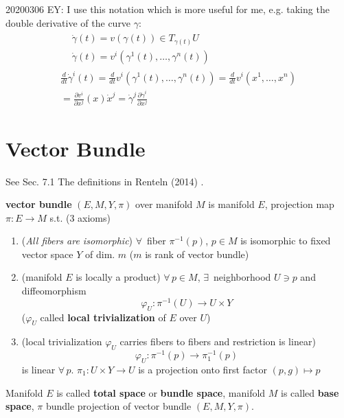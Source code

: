 20200306 EY: I use this notation which is more useful for me, e.g. taking the double derivative of the curve $\gamma$: 
\[
\begin{gathered} 
\begin{aligned} 
& \dot{\gamma}(t) = v(\gamma(t)) \in T_{\gamma(t)}U \\ 
& \dot{\gamma}(t) = v^i(\gamma^1(t), \dots, \gamma^n(t))
\end{aligned} \\ 
\frac{d}{dt} \dot{\gamma}^i(t) = \frac{d}{dt} v^i(\gamma^1(t), \dots , \gamma^n(t)) = \frac{d}{dt} v^i(x^1 , \dots , x^n) \\
= \frac{\partial v^i}{\partial x^j}(x) \dot{x}^j = \dot{\gamma}^j \frac{\partial \dot{\gamma}^i}{\partial x^j}
\end{gathered} 
\]

\section{Vector Bundle}

See Sec. 7.1 The definitions in Renteln (2014) \cite{dgdt:Rent2014}.

\begin{definition}
\textbf{vector bundle} $(E,M,Y,\pi)$ over manifold $M$ is manifold $E$, projection map $\pi:E \to M$ s.t. (3 axioms)
\begin{enumerate}
\item (\emph{All fibers are isomorphic}) $\forall \, $ fiber $\pi^{-1}(p)$, $p\in M$ is isomorphic to fixed vector space $Y$ of dim. $m$ ($m$ is rank of vector bundle)
\item (manifold $E$ is locally a product) $\forall \, p \in M$, $\exists \, $ neighborhood $U\ni p$ and diffeomorphism
\begin{equation}\label{dgdt:Eq:VectorBundleTotalSpaceIsLocalProduct}
\varphi_U: \pi^{-1}(U) \to U\times Y
\end{equation}
($\varphi_U$ called \textbf{local trivialization} of $E$ over $U$)
\item (local trivialization $\varphi_U$ carries fibers to fibers and restriction is linear) 
\begin{equation}
\varphi_U: \pi^{-1}(p) \to \pi^{-1}_1(p)
\end{equation}
is linear $\forall \, p$. $\pi_1: U\times Y \to U$ is a projection onto first factor $(p,g) \mapsto p$
\end{enumerate}

Manifold $E$ is called \textbf{total space} or \textbf{bundle space}, manifold $M$ is called \textbf{base space}, $\pi$ bundle projection of vector bundle $(E,M,Y,\pi)$.
\end{definition}

